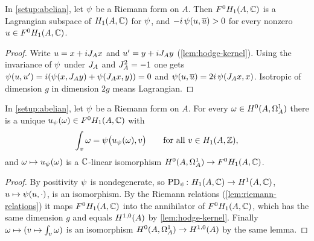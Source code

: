 \begin{lemma}\label{lem:riemann-relations}
In \cref{setup:abelian}, let $\psi_{}$ be a Riemann form on $A$.
Then $F^{0}H_{1}(A,\mathbb{C})$ is a Lagrangian subspace of $H_{1}(A,\mathbb{C})$
for $\psi_{}$, and $-i\,\psi_{}(u, \overline{u}) > 0$ for every
nonzero $u \in F^{0}H_{1}(A,\mathbb{C})$.
\end{lemma}

\begin{proof}
Write $u = x + iJ_{A}x$ and $u' = y + iJ_{A}y$
(\cref{lem:hodge-kernel}). Using the invariance of $\psi_{}$ under
$J_{A}$ and $J_{A}^{2} = -1$ one gets
$\psi_{}(u, u') = i(\psi_{}(x, J_{A}y) +
\psi_{}(J_{A}x, y)) = 0$ and
$\psi_{}(u, \overline{u}) = 2i\,\psi_{}(J_{A}x, x)$.
Isotropic of dimension $g$ in dimension $2g$ means Lagrangian.
\end{proof}

\begin{proposition}
\label{prop:poincare-hodge}
In \cref{setup:abelian}, let $\psi_{}$ be a Riemann form on $A$. For
every $\omega \in H^{0}(A,\Omega^{1}_{A})$ there is a unique
$u_{\psi_{}}(\omega) \in F^{0}H_{1}(A,\mathbb{C})$ with
\[
  \int_{v}\omega = \psi_{}\bigl(u_{\psi_{}}(\omega), v\bigr)
  \qquad\text{for all } v \in H_{1}(A,\mathbb{Z}),
\]
and $\omega \mapsto u_{\psi_{}}(\omega)$ is a $\mathbb{C}$-linear
isomorphism $H^{0}(A,\Omega^{1}_{A}) \to F^{0}H_{1}(A,\mathbb{C})$.
\end{proposition}

\begin{proof}
By positivity $\psi_{}$ is nondegenerate, so
$\mathrm{PD}_{\psi_{}} \colon H_{1}(A,\mathbb{C}) \to H^{1}(A,\mathbb{C})$,
$u \mapsto \psi_{}(u, \cdot)$, is an isomorphism. By the Riemann
relations (\cref{lem:riemann-relations}) it maps $F^{0}H_{1}(A,\mathbb{C})$ into
the annihilator of $F^{0}H_{1}(A,\mathbb{C})$, which has the same dimension $g$
and equals $H^{1,0}(A)$ by \cref{lem:hodge-kernel}. Finally
$\omega \mapsto (v \mapsto \int_{v}\omega)$ is an isomorphism
$H^{0}(A,\Omega^{1}_{A}) \to H^{1,0}(A)$ by the same lemma.
\end{proof}

